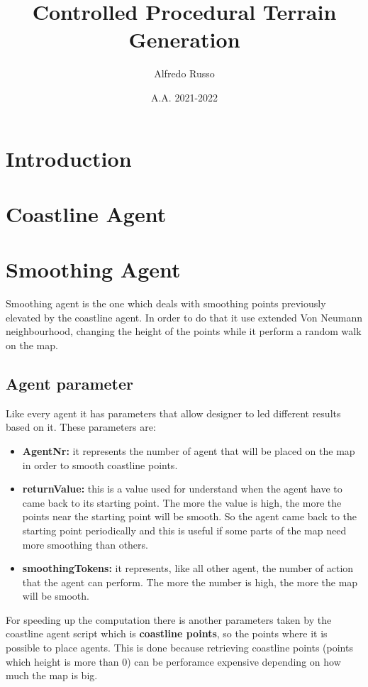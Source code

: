 \documentclass[12pt]{article}
\title{Controlled Procedural Terrain Generation}
\author{Alfredo Russo}
\date{A.A. 2021-2022}
\begin{document}
    \maketitle
    \newpage
    \tableofcontents
    \newpage
    

    \section{Introduction}

    \section{Coastline Agent}

    \section{Smoothing Agent}
    Smoothing agent is the one which deals with smoothing points previously elevated by the coastline agent.
    In order to do that it use extended Von Neumann neighbourhood, changing the height of the points while it perform a random walk 
    on the map.
    
    \subsection{Agent parameter}
    Like every agent it has parameters that allow designer to led different results based on it.
    These parameters are:
    \begin{itemize}
        \item \textbf{AgentNr:} it represents the number of agent that will be placed on the map in order to smooth coastline points.
        \item \textbf{returnValue:} this is a value used for understand when the agent have to came back to its starting point. The more the value is high, the more
        the points near the starting point will be smooth. So the agent came back to the starting point periodically and this is useful if some parts of the map need 
        more smoothing than others.
        \item \textbf{smoothingTokens:} it represents, like all other agent, the number of action that the agent can perform. The more the number is high, the more the map will be smooth.
    \end{itemize}

    For speeding up the computation there is another parameters taken by the coastline agent script which is \textbf{coastline points}, so the points where it is possible to place agents.
    This is done because retrieving coastline points (points which height is more than 0) can be perforamce expensive depending on how much the map is big. 
\end{document}
